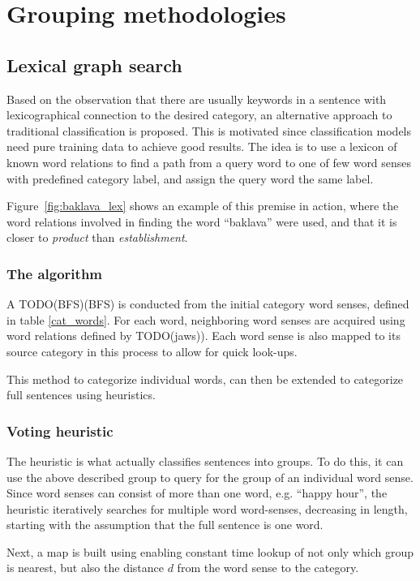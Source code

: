 \documentclass[a4paper,11pt]{kth-mag}
\newcommand{\gls}[1]{TODO(#1)}
\begin{document}
\section{Grouping methodologies}
\subsection{Lexical graph search}
Based on the observation that there are usually keywords in a sentence with lexicographical
connection to the desired category, an alternative approach to traditional classification is proposed.
This is motivated since classification models need pure training data to achieve good results.
The idea is to use a lexicon of known word relations to find a path from a query word to one of
few word senses with predefined category label, and assign the query word the same label.

Figure~\ref{fig:baklava_lex} shows an example of this premise in action, where the word relations involved in finding the word ``baklava'' were used, and that it is closer to \emph{product} than \emph{establishment}.

\subsubsection{The algorithm}
A \gls{BFS}(BFS) is conducted from the initial category word senses, defined in table \ref{cat_words}. For each word, neighboring word senses are acquired using word relations defined by \gls{jaws}). Each word sense is also mapped to its source category in this process to allow for quick look-ups.

This method to categorize individual words, can then be extended to categorize full sentences using heuristics.

\subsubsection{Voting heuristic}
The heuristic is what actually classifies sentences into groups. To do this, it can use the above described group to query for the group of an individual word sense. Since word senses can consist of more than one word, e.g. ``happy hour'', the heuristic iteratively searches for multiple word word-senses, decreasing in length, starting with the assumption that the full sentence is one word.

Next, a map is built using enabling constant time lookup of not only which group is nearest,
but also the distance $d$ from the word sense to the category.
\end{document}
